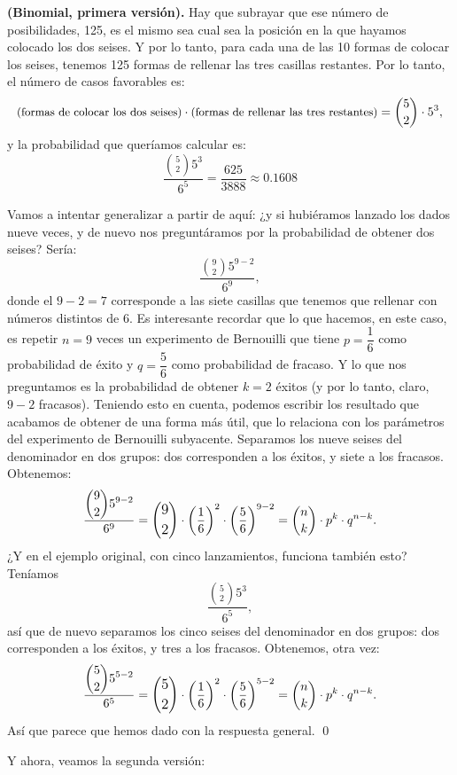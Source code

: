 \begin{Ejemplo}{\bf (Binomial, primera versión).}
    Hay que subrayar que ese número de posibilidades, 125, es el mismo sea cual sea la posición en la que hayamos colocado los dos seises. Y por lo tanto, para cada una de las 10 formas de colocar los seises, tenemos 125 formas de rellenar las tres casillas restantes. Por lo tanto, el número de casos favorables es:
        \[\small\mbox{(formas de colocar los dos seises)}\cdot\mbox{(formas de rellenar las tres  restantes)}=\binom{5}{2} \cdot 5^3,\]
    y la probabilidad que queríamos calcular es:
         \[\dfrac{\displaystyle\binom{5}{2}5^3}{6^5}=\dfrac{625}{3888}\approx 0.1608\]

     Vamos a intentar generalizar a partir de aquí: ¿y si hubiéramos lanzado los dados nueve veces, y de nuevo nos preguntáramos por la probabilidad de obtener dos seises? Sería:
     \[\dfrac{\displaystyle\binom{9}{2}5^{9-2}}{6^9},\]
     donde el $9-2=7$ corresponde a las siete casillas que tenemos que rellenar con números distintos de $6$. Es interesante recordar que lo que hacemos, en este caso, es repetir $n=9$ veces un experimento de Bernouilli que tiene $p=\dfrac{1}{6}$ como probabilidad de éxito y $q=\dfrac{5}{6}$ como probabilidad de fracaso. Y lo que nos preguntamos es la probabilidad de obtener $k=2$ éxitos (y por lo tanto, claro, $9-2$ fracasos). Teniendo esto en cuenta, podemos escribir los resultado que acabamos de obtener de una forma más útil, que lo relaciona con los parámetros del experimento de Bernouilli subyacente. Separamos los nueve seises del denominador en dos grupos: dos corresponden a los éxitos, y siete a los fracasos. Obtenemos:
     \[\dfrac{\displaystyle\binom{9}{2}5^{9-2}}{6^9}=
     \mbox{\large $ \displaystyle\binom{9}{2}$}\cdot\left(\dfrac{1}{6}\right)^2\cdot\left(\dfrac{5}{6}\right)^{9-2}=
     \binom{n}{k}\cdot p^k\cdot q^{n-k}.
     \]
     ¿Y en el ejemplo original, con cinco lanzamientos, funciona también esto? Teníamos
     \[\dfrac{\displaystyle\binom{5}{2}5^3}{6^5},\]
     así que de nuevo separamos los cinco seises del denominador en dos grupos: dos corresponden a los éxitos, y tres a los fracasos. Obtenemos, otra vez:
     \[\dfrac{\displaystyle\binom{5}{2}5^{5-2}}{6^5}=
     \mbox{\large $ \displaystyle\binom{5}{2}$}\cdot\left(\dfrac{1}{6}\right)^2\cdot\left(\dfrac{5}{6}\right)^{5-2}=
     \binom{n}{k}\cdot p^k\cdot q^{n-k}.
     \]
     Así que parece que hemos dado con la respuesta general.
     \quad\qed
\end{Ejemplo}

\noindent Y ahora, veamos la segunda versión:

